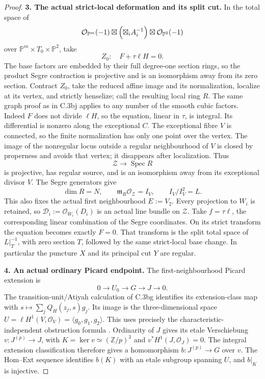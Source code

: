 \begin{proof}
\textbf{3. The actual strict-local deformation and its split cut.}
In the total space of
\[
 \mathcal O_{\mathbb P^m}(-1)
       \boxtimes\Bigl(\boxtimes_i A_i^{-1}\Bigr)
       \boxtimes\mathcal O_{\mathbb P^2}(-1)
\]
over $\mathbb P^m\times T_0\times\mathbb P^2$, take
\[
 Z_0:\quad F+\tau\ell H=0.
 \tag{C.3bk.6}
\]
The base factors are embedded by their full degree-one section rings,
so the product Segre contraction is projective and is an isomorphism
away from its zero section. Contract $Z_0$, take the reduced affine
image and its normalization, localize at its vertex, and strictly
henselize; call the resulting local ring $R$. The same graph proof
as in C.3bj applies to any number of the smooth cubic factors.
Indeed $F$ does not divide $\ell H$, so the equation, linear in
$\tau$, is integral. Its differential is nonzero along the exceptional
$C$. The exceptional fibre $V$ is connected, so the finite normalization
has only one point over the vertex. The image of the nonregular locus
outside a regular neighbourhood of $V$ is closed by properness and
avoids that vertex; it disappears after localization. Thus
\[
 \mathcal Z\longrightarrow\operatorname{Spec}R
\]
is projective, has regular source, and is an isomorphism away from
its exceptional divisor $V$. The Segre generators give
\[
 \dim R=N,\qquad \mathfrak m_R\mathcal O_{\mathcal Z}=I_V,
 \qquad I_V/I_V^2=L.
 \tag{C.3bk.7}
\]
This also fixes the actual first neighbourhood $E:=V_2$.
Every projection to $W_i$ is retained, so
$\mathcal D_i:=\mathcal O_{W_i}(D_i)$ is an actual line bundle
on $\mathcal Z$. Take $f=\tau\ell$, the corresponding linear
combination of the Segre coordinates. On its strict transform the
equation becomes exactly $F=0$. That transform is the split total
space of $L|_T^{-1}$, with zero section $T$, followed by the same
strict-local base change. In particular the puncture $X$ and its
principal cut $Y$ are regular.

\textbf{4. An actual ordinary Picard endpoint.}
The first-neighbourhood Picard extension is
\[
 0\longrightarrow U_0\longrightarrow G\longrightarrow J\longrightarrow0.
 \tag{C.3bk.8}
\]
The transition-unit/Atiyah calculation of C.3bg identifies its
extension-class map with
$s\mapsto\sum_jQ_H(z_j,s)g_j$.
Its image is the three-dimensional space
$U=\ell H^1(V,\mathcal O_V)=\langle g_0,g_1,g_2\rangle$.
This uses precisely the characteristic-independent obstruction formula
\citep[Theorem 2.6 and formula (2.7.2), pp.~166--167]{D_Illusie1972Torsors}.
Ordinarity of $J$ gives its etale Verschiebung
$v:J^{(p)}\to J$, with $K=\ker v\simeq(\mathbb Z/p)^3$ and
$v^*H^1(J,\mathcal O_J)=0$.
The integral extension classification
\citep[Section 3.2.3, equation (3.8), p.~23]{D_BrionIsogenyII}
therefore gives a homomorphism $b:J^{(p)}\to G$ over $v$.
The Hom--Ext sequence identifies $b(K)$ with an etale subgroup
spanning $U$, and $b|_K$ is injective.


\end{proof}
